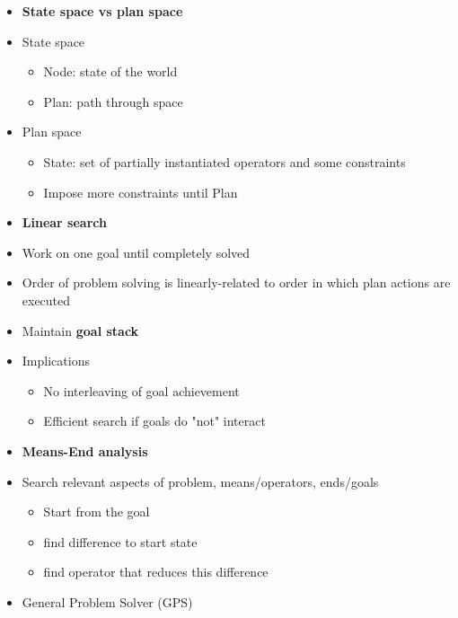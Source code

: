 \begin{itemize}
\item \textbf{State space vs plan space}
\item State space
	\begin{itemize}
	\item Node: state of the world
	\item Plan: path through space
	\end{itemize}
	
\item Plan space
	\begin{itemize}
	\item State: set of partially instantiated operators and some constraints
	\item Impose more constraints until Plan
	\end{itemize}

\item \textbf{Linear search}
\item Work on one goal until completely solved
\item Order of problem solving is linearly-related to order in which plan actions are executed
\item Maintain \textbf{goal stack}
\item Implications
	\begin{itemize}
	\item No interleaving of goal achievement
	\item Efficient search if goals do "not" interact
	\end{itemize}
	
\item \textbf{Means-End analysis}
\item Search relevant aspects of problem, means/operators, ends/goals
	\begin{itemize}
	\item Start from the goal
	\item find difference to start state
	\item find operator that reduces this difference
	\end{itemize}
\item General Problem Solver (GPS)


\end{itemize}
